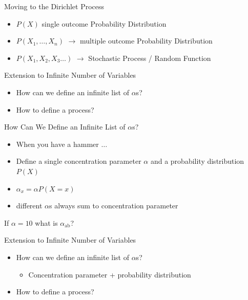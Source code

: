 \documentclass[11pt]{beamer}
\begin{document}
	\begin{frame}{Moving to the Dirichlet Process}
		
		\begin{itemize}
			\item $P(X)$ single outcome Probability Distribution
			\item $P(X_1,\dots,X_n)$ $\rightarrow$ multiple outcome Probability Distribution
			\item $P(X_1,X_2,X_3\dots)$ $\rightarrow$ Stochastic Process / Random Function
		\end{itemize}
	\end{frame}
	
	\begin{frame}{Extension to Infinite Number of Variables}
		\begin{itemize}
			\item How can we define an infinite list of $\alpha$s?
			\item How to define a process?
		\end{itemize}
	\end{frame}
	
	\begin{frame}{How Can We Define an Infinite List of $\alpha$s?}
		\centering
		
		\begin{itemize}
			\item When you have a hammer $\dots$
			\item Define a single concentration parameter $\alpha$ and a probability distribution $P(X)$
			\item $\alpha_x = \alpha P(X = x)$
			\item different $\alpha$s always sum to concentration parameter
		\end{itemize}
		
		
		\vspace{10pt} If $\alpha = 10$ what is $\alpha_{\text{ab}}$?
	\end{frame}
	
	\begin{frame}{Extension to Infinite Number of Variables}
		\begin{itemize}
			\item How can we define an infinite list of $\alpha$s?
			\begin{itemize}
				\item Concentration parameter + probability distribution \checkmark
			\end{itemize}
			\item How to define a process?
		\end{itemize}
	\end{frame}
	
\end{document}
